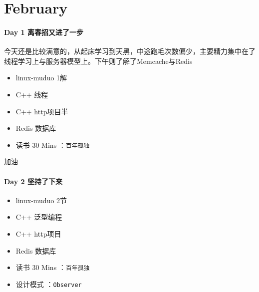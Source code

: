 \documentclass[UTF8,a4paper,8pt]{ctexart}
\begin{document}
\section{February}
	\paragraph{Day 1   离春招又进了一步   \quad     }
		今天还是比较满意的，从起床学习到天黑，中途跑毛次数偏少，主要精力集中在了线程学习上与服务器模型上。下午则了解了Memcache与Redis
		
		\begin{itemize}[itemindent = 1em]
			\renewcommand\labelitemi{\makebox[0pt][l]{$\square$}\raisebox{.15ex}{\hspace{0.1em}$\checkmark$}}		
			\item   linux-muduo 1解
			\item   C++ 线程 
			\item   C++ http项目半
			\item   Redis 数据库
			\renewcommand\labelitemi{\makebox[0pt][l]{$\square$}\hspace{1em}}
			\item   读书  30 Mins	：\verb|百年孤独|
			
		\end{itemize}
		
		加油
	\paragraph{Day 2   坚持了下来   \quad     }
		\begin{itemize}[itemindent = 1em]
			\renewcommand\labelitemi{\makebox[0pt][l]{$\square$}\raisebox{.15ex}{\hspace{0.1em}$\checkmark$}}		
			\item   linux-muduo 2节
			\item   C++ 泛型编程
			\item   C++ http项目
			\item   Redis 数据库
					
			\renewcommand\labelitemi{\makebox[0pt][l]{$\square$}\hspace{1em}}
			\item   读书  30 Mins	：\verb|百年孤独|
					
			\item   设计模式 ：\verb|Observer| 
		\end{itemize}
\end{document}
